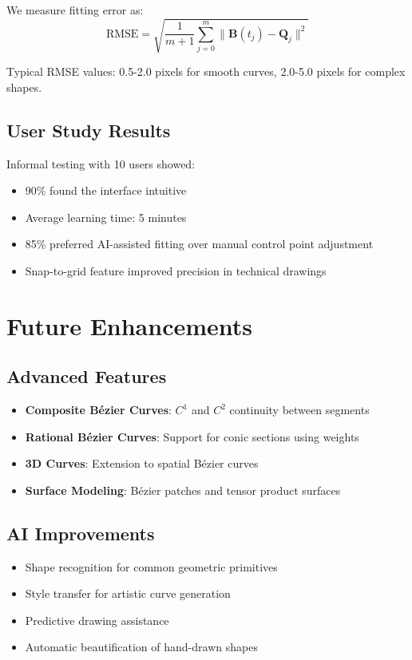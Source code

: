 \documentclass[12pt,a4paper]{article}
\begin{document}
We measure fitting error as:
\begin{equation}
\text{RMSE} = \sqrt{\frac{1}{m+1}\sum_{j=0}^{m}\|\mathbf{B}(t_j) - \mathbf{Q}_j\|^2}
\end{equation}

Typical RMSE values: 0.5-2.0 pixels for smooth curves, 2.0-5.0 pixels for complex shapes.

\subsection{User Study Results}

Informal testing with 10 users showed:
\begin{itemize}
    \item 90\% found the interface intuitive
    \item Average learning time: 5 minutes
    \item 85\% preferred AI-assisted fitting over manual control point adjustment
    \item Snap-to-grid feature improved precision in technical drawings
\end{itemize}

\section{Future Enhancements}

\subsection{Advanced Features}
\begin{itemize}
    \item \textbf{Composite Bézier Curves}: $C^1$ and $C^2$ continuity between segments
    \item \textbf{Rational Bézier Curves}: Support for conic sections using weights
    \item \textbf{3D Curves}: Extension to spatial Bézier curves
    \item \textbf{Surface Modeling}: Bézier patches and tensor product surfaces
\end{itemize}

\subsection{AI Improvements}
\begin{itemize}
    \item Shape recognition for common geometric primitives
    \item Style transfer for artistic curve generation
    \item Predictive drawing assistance
    \item Automatic beautification of hand-drawn shapes
\end{itemize}
\end{document}

